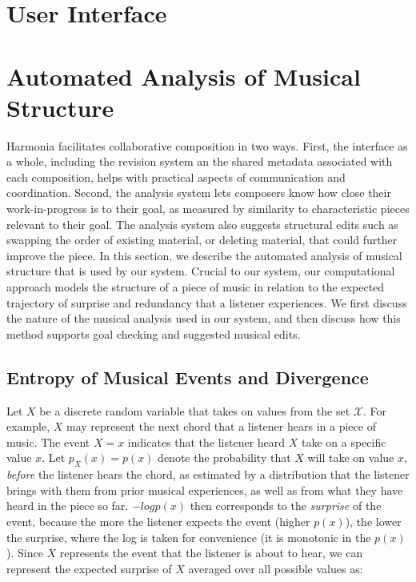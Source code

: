 \documentclass[final,authoryear,5p,times,twocolumn]{elsarticle}
\begin{document}


\section{User Interface}


\section{Automated Analysis of Musical Structure}

Harmonia facilitates collaborative composition in two ways. First, the interface as a whole, including the revision system an the shared metadata associated with each composition, helps with practical aspects of communication and coordination. Second, the analysis system lets composers know how close their work-in-progress is to their goal, as measured by similarity to characteristic pieces relevant to their goal. The analysis system also suggests structural edits such as swapping the order of existing material, or deleting material, that could further improve the piece. In this section, we describe the automated analysis of musical structure that is used by our system. Crucial to our system, our computational approach models the structure of a piece of music in relation to the expected trajectory of surprise and redundancy that a listener experiences. We first discuss the nature of the musical analysis used in our system, and then discuss how this method supports goal checking and suggested musical edits.

 \subsection{Entropy of Musical Events and Divergence}
 
Let $X$ be a discrete random variable that takes on values from the set $\mathcal{X}$. For example, $X$ may represent the next chord that a listener hears in a piece of music. The event $X=x$ indicates that the listener heard $X$ take on a specific value $x$. Let $p_X(x) = p(x)$ denote the probability that $X$ will take on value $x$, \textit{before} the listener hears the chord, as estimated by a distribution that the listener brings with them from prior musical experiences, as well as from what they have heard in the piece so far. $-logp(x)$ then corresponds to the \textit{surprise} of the event, because the more the listener expects the event (higher $p(x)$), the lower the surprise, where the log is taken for convenience (it is monotonic in the $p(x)$). Since $X$ represents the event that the listener is about to hear, we can represent the expected surprise of $X$ averaged over all possible values as:
 
\end{document}
